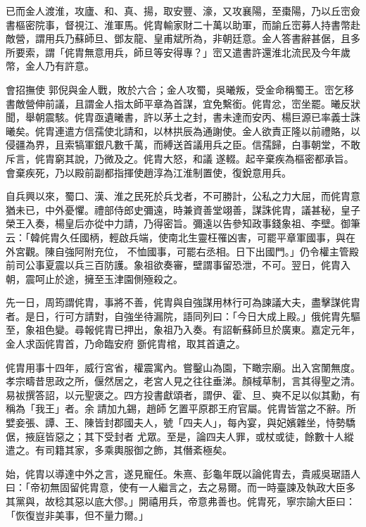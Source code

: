 \begin{pinyinscope}
 已而金人渡淮，攻廬、和、真、揚，取安豐、濠，又攻襄陽，至棗陽，乃以丘崈僉書樞密院事，督視江、淮軍馬。侂胄輸家財二十萬以助軍，而諭丘崈募人持書幣赴敵營，謂用兵乃蘇師旦、鄧友龍、皇甫斌所為，非朝廷意。金人答書辭甚倨，且多所要索，謂「侂胄無意用兵，師旦等安得專？」崈又遣書許還淮北流民及今年歲幣，金人乃有許意。



 會招撫使
 郭倪與金人戰，敗於六合；金人攻蜀，吳曦叛，受金命稱蜀王。崈乞移書敵營伸前議，且謂金人指太師平章為首謀，宜免繫銜。侂胄忿，崈坐罷。曦反狀聞，舉朝震駭。侂胄亟遺曦書，許以茅土之封，書未達而安丙、楊巨源已率義士誅曦矣。侂胄連遣方信孺使北請和，以林拱辰為通謝使。金人欲責正隆以前禮賂，以侵疆為界，且索犒軍銀凡數千萬，而縛送首議用兵之臣。信孺歸，白事朝堂，不敢斥言，侂胄窮其說，乃微及之。侂胄大怒，和議
 遂輟。起辛棄疾為樞密都承旨。會棄疾死，乃以殿前副都指揮使趙淳為江淮制置使，復銳意用兵。



 自兵興以來，蜀口、漢、淮之民死於兵戈者，不可勝計，公私之力大屈，而侂胄意猶未已，中外憂懼。禮部侍郎史彌遠，時兼資善堂翊善，謀誅侂胄，議甚秘，皇子榮王入奏，楊皇后亦從中力請，乃得密旨。彌遠以告參知政事錢象祖、李壁。御筆云：「韓侂胄久任國柄，輕啟兵端，使南北生靈枉罹凶害，可罷平章軍國事，與在外宮觀。陳自強阿附充位，
 不恤國事，可罷右丞相。日下出國門。」仍令權主管殿前司公事夏震以兵三百防護。象祖欲奏審，壁謂事留恐泄，不可。翌日，侂胄入朝，震呵止於途，擁至玉津園側殛殺之。



 先一日，周筠謂侂胄，事將不善，侂胄與自強謀用林行可為諫議大夫，盡擊謀侂胄者。是日，行可方請對，自強坐待漏院，語同列曰：「今日大成上殿。」俄侂胄先驅至，象祖色變。尋報侂胄已押出，象祖乃入奏。有詔斬蘇師旦於廣東。嘉定元年，金人求函侂胄首，乃命臨安府
 斵侂胄棺，取其首遺之。



 侂胄用事十四年，威行宮省，權震寓內。嘗鑿山為園，下瞰宗廟。出入宮闈無度。孝宗疇昔思政之所，偃然居之，老宮人見之往往垂涕。顏棫草制，言其得聖之清。易袚撰答詔，以元聖褒之。四方投書獻頌者，謂伊、霍、旦、奭不足以似其勳，有稱為「我王」者。余𡕇請加九錫，趙師𢍰乞置平原郡王府官屬。侂胄皆當之不辭。所嬖妾張、譚、王、陳皆封郡國夫人，號「四夫人」，每內宴，與妃嬪雜坐，恃勢驕倨，掖庭皆惡之；其下受封者
 尤眾。至是，論四夫人罪，或杖或徒，餘數十人縱遣之。有司籍其家，多乘輿服御之飾，其僭紊極矣。



 始，侂胄以導達中外之言，遂見寵任。朱熹、彭龜年既以論侂胄去，貴戚吳琚語人曰：「帝初無固留侂胄意，使有一人繼言之，去之易爾。而一時臺諫及執政大臣多其黨與，故稔其惡以底大僇。」開禧用兵，帝意弗善也。侂胄死，寧宗諭大臣曰：「恢復豈非美事，但不量力爾。」




\end{pinyinscope}
